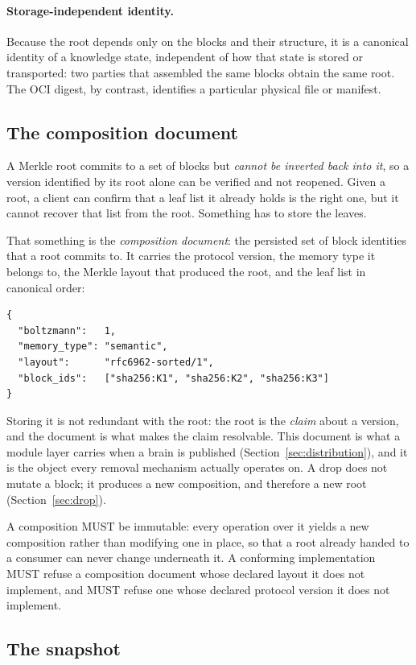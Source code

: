 \documentclass[11pt,a4paper]{article}
\begin{document}
\paragraph{Storage-independent identity.}
Because the root depends only on the blocks and their structure, it is a
canonical identity of a knowledge state, independent of how that state is
stored or transported: two parties that assembled the same blocks obtain the
same root. The OCI digest, by contrast, identifies a particular physical file
or manifest.

\subsection{The composition document}
\label{sec:composition-doc}

A Merkle root commits to a set of blocks but \emph{cannot be inverted back
into it}, so a version identified by its root alone can be verified and not
reopened. Given a root, a client can
confirm that a leaf list it already holds is the right one, but it cannot
recover that list from the root. Something has to store the leaves.

That something is the \emph{composition document}: the persisted set of block
identities that a root commits to. It carries the protocol version, the memory
type it belongs to, the Merkle layout that produced the root, and the leaf list
in canonical order:
\begin{verbatim}
{
  "boltzmann":   1,
  "memory_type": "semantic",
  "layout":      "rfc6962-sorted/1",
  "block_ids":   ["sha256:K1", "sha256:K2", "sha256:K3"]
}
\end{verbatim}
Storing it is not redundant with the root: the root is the \emph{claim} about a
version, and the document is what makes the claim resolvable. This document is
what a module layer carries when a brain is published
(Section~\ref{sec:distribution}), and it is the object every removal mechanism
actually operates on. A drop does not mutate a block; it produces a new
composition, and therefore a new root (Section~\ref{sec:drop}).

A composition MUST be immutable: every operation over it yields a new
composition rather than modifying one in place, so that a root already handed to
a consumer can never change underneath it. A conforming implementation MUST
refuse a composition document whose declared layout it does not implement, and
MUST refuse one whose declared protocol version it does not implement.

\subsection{The snapshot}
\label{sec:snapshot}
\end{document}
